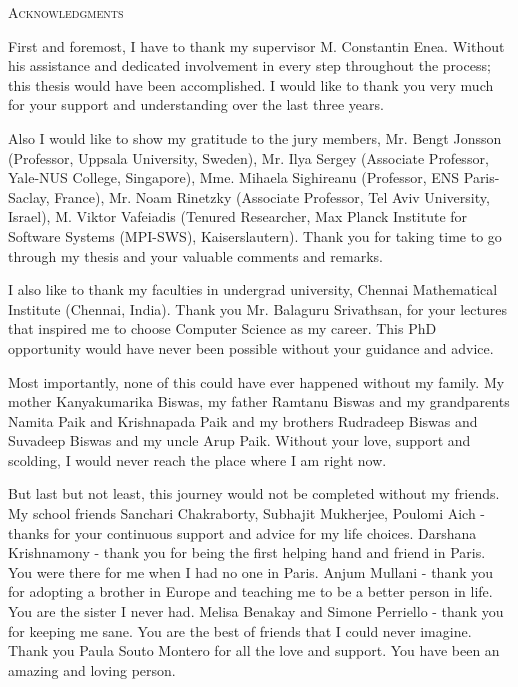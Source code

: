 \begin{center}
    \textsc{Acknowledgments}
  \end{center}
  \noindent

First and foremost, I have to thank my supervisor M. Constantin Enea. Without his assistance and dedicated involvement in every step throughout the process; this thesis would have been accomplished. I would like to thank you very much for your support and understanding over the last three years.

Also I would like to show my gratitude to the jury members, Mr. Bengt Jonsson (Professor, Uppsala University, Sweden), Mr. Ilya Sergey (Associate Professor, Yale-NUS College, Singapore), Mme. Mihaela Sighireanu (Professor, ENS Paris-Saclay, France), Mr. Noam Rinetzky (Associate Professor, Tel Aviv University, Israel), M. Viktor Vafeiadis (Tenured Researcher, Max Planck Institute for Software Systems (MPI-SWS), Kaiserslautern). Thank you for taking time to go through my thesis and your valuable comments and remarks.

I also like to thank my faculties in undergrad university, Chennai Mathematical Institute (Chennai, India). Thank you Mr. Balaguru Srivathsan, for your lectures that inspired me to choose Computer Science as my career. This PhD opportunity would have never been possible without your guidance and advice.

Most importantly, none of this could have ever happened without my family. My mother Kanyakumarika Biswas, my father Ramtanu Biswas and my grandparents Namita Paik and Krishnapada Paik and my brothers Rudradeep Biswas and Suvadeep Biswas and my uncle Arup Paik. Without your love, support and scolding, I would never reach the place where I am right now.

But last but not least, this journey would not be completed without my friends. My school friends Sanchari Chakraborty, Subhajit Mukherjee, Poulomi Aich - thanks for your continuous support and advice for my life choices. Darshana Krishnamony - thank you for being the first helping hand and friend in Paris. You were there for me when I had no one in Paris. Anjum Mullani - thank you for adopting a brother in Europe and teaching me to be a better person in life. You are the sister I never had. Melisa Benakay and Simone Perriello - thank you for keeping me sane. You are the best of friends that I could never imagine. Thank you Paula Souto Montero for all the love and support. You have been an amazing and loving person.

  